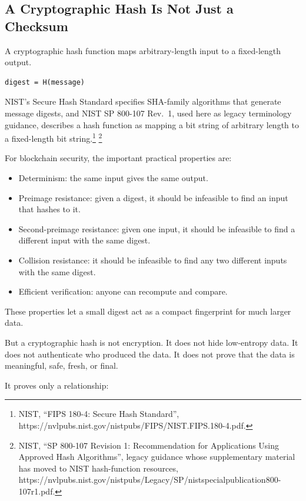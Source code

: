 \subsection{A Cryptographic Hash Is Not Just a Checksum}

A cryptographic hash function maps arbitrary-length input to a
fixed-length output.

\begin{lstlisting}
digest = H(message)
\end{lstlisting}

NIST's Secure Hash Standard specifies SHA-family algorithms that
generate message digests, and NIST SP 800-107 Rev.~1, used here as
legacy terminology guidance, describes a hash function as mapping a bit
string of arbitrary length to a fixed-length bit string.\footnote{NIST,
  ``FIPS 180-4: Secure Hash Standard'',
  https://nvlpubs.nist.gov/nistpubs/FIPS/NIST.FIPS.180-4.pdf.}
\footnote{NIST, ``SP 800-107 Revision 1: Recommendation for Applications
  Using Approved Hash Algorithms'', legacy guidance whose supplementary
  material has moved to NIST hash-function resources,
  https://nvlpubs.nist.gov/nistpubs/Legacy/SP/nistspecialpublication800-107r1.pdf.}

For blockchain security, the important practical properties are:

\begin{itemize}
\tightlist
\item
  Determinism: the same input gives the same output.
\item
  Preimage resistance: given a digest, it should be infeasible to find
  an input that hashes to it.
\item
  Second-preimage resistance: given one input, it should be infeasible
  to find a different input with the same digest.
\item
  Collision resistance: it should be infeasible to find any two
  different inputs with the same digest.
\item
  Efficient verification: anyone can recompute and compare.
\end{itemize}

These properties let a small digest act as a compact fingerprint for
much larger data.

But a cryptographic hash is not encryption. It does not hide low-entropy
data. It does not authenticate who produced the data. It does not prove
that the data is meaningful, safe, fresh, or final.

It proves only a relationship:

